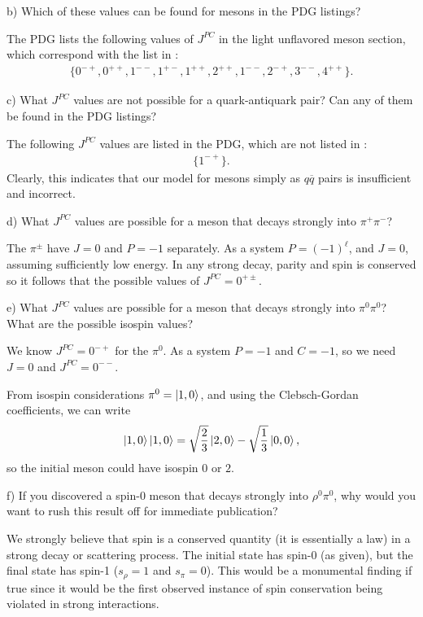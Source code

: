 b) Which of these values can be found for mesons in the PDG listings? 

The PDG lists the following values of $J^{PC}$ in the light unflavored meson section, which correspond with the list in :
\begin{align}
    \label{eq:JPC-PDG}
    \{ 0^{-+}, 0^{++}, 1^{--}, 1^{+-}, 1^{++}, 2^{++}, 1^{--}, 2^{-+}, 3^{--}, 4^{++} \} 
.\end{align}


c) What $J^{PC}$ values are not possible for a quark-antiquark pair?
Can any of them be found in the PDG listings?

The following $J^{PC}$ values are listed in the PDG, which are not listed in :
\begin{eqnarray}
    \label{eq:JPC-forbidden}
    \{ 1^{-+} \}  
.\end{eqnarray}
Clearly, this indicates that our model for mesons simply as $q\overline{q}$ pairs is insufficient and incorrect.

d) What $J^{PC}$ values are possible for a meson that decays strongly into $\pi^{+}\pi^{-}$?

The $\pi^{\pm}$ have $J = 0$ and $P = -1$ separately.
As a system $P = (-1)^{\ell}$, and $J = 0$, assuming sufficiently low energy.
In any strong decay, parity and spin is conserved so it follows that the possible values of $J^{PC} = 0^{+\pm}$.

e) What $J^{PC}$ values are possible for a meson that decays strongly into $\pi^{0}\pi^{0}$?
What are the possible isospin values?

We know $J^{PC} = 0^{-+}$ for the $\pi^{0}$.
As a system $P = -1$ and $C = -1$, so we need $J = 0$ and $J^{PC} = 0^{--}$.

From isospin considerations $\pi^{0} = \ket{1,0}$, and using the Clebsch-Gordan coefficients, we can write
\begin{eqnarray}
    \label{eq:isospin-CG}
    \ket{1,0}\ket{1,0} = \sqrt{\frac{2}{3}}\ket{2,0} - \sqrt{\frac{1}{3}}\ket{0,0}
,\end{eqnarray}
so the initial meson could have isospin $0$ or $2$.

f) If you discovered a spin-0 meson that decays strongly into $\rho^{0}\pi^{0}$, why would you want to rush this result off for immediate publication?

We strongly believe that spin is a conserved quantity (it is essentially a law) in a strong decay or scattering process.
The initial state has spin-0 (as given), but the final state has spin-1 ($s_{\rho} = 1$ and $s_{\pi} = 0$).
This would be a monumental finding if true since it would be the first observed instance of spin conservation being violated in strong interactions.

